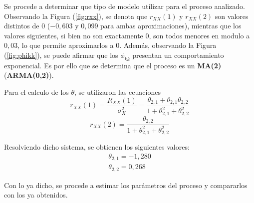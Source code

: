 Se procede a determinar que tipo de modelo utilizar para el proceso analizado. Observando la Figura (\ref{fig:rxx}), se denota que $r_{XX}(1)$ y $r_{XX}(2)$ son valores distintos de 0 ($-0,603$ y $0,099$ para ambas aproximaciones), mientras que los valores siguientes, si bien no son exactamente 0, son todos menores en modulo a $0,03$, lo que permite aproximarlos a 0. Además, observando la Figura (\ref{fig:phikk}), se puede afirmar que los $\phi_{kk}$ presentan un comportamiento exponencial. Es por ello que se determina que el proceso es un \textbf{MA(2)} (\textbf{ARMA(0,2)}).

Para el calculo de los $\theta$, se utilizaron las ecuaciones
\begin{equation}
	r_{XX}(1) = \frac{R_{XX}(1)}{\sigma_X^2} = \frac{\theta_{2,1} + \theta_{2,1} \theta_{2,2}}{1 +\theta_{2,1}^2 + \theta_{2,2}^2}
\end{equation}
\begin{equation}
	r_{XX}(2) = \frac{\theta_{2,2}}{1 +\theta_{2,1}^2 + \theta_{2,2}^2}
\end{equation}

Resolviendo dicho sistema, se obtienen los siguientes valores:
\begin{equation}
\begin{gathered}
	\theta_{2,1} = -1,280	\\
	\theta_{2,2} = 0,268	
\end{gathered}
\end{equation}

Con lo ya dicho, se procede a estimar los parámetros del proceso y compararlos con los ya obtenidos.

